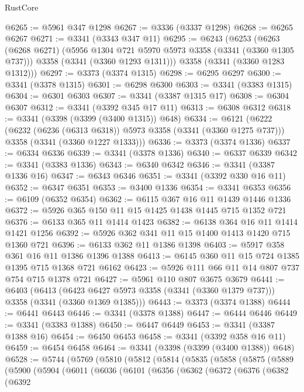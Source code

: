 \begin{lexlean}{RustCore}
\begin{coremodule}
@6265 := @5961 @347 @1298
@6267 := @3336 (@3337 @1298)
@6268 := @6265 @6267
@6271 := @3341 (@3343 @347 @11)
@6295 := @6243
    (@6253
      (@6263
        (@6268 @6271)
        (@5956 @1304 @721 @5970 @5973 @3358 (@3341 (@3360 @1305 @737)))
        @3358
        (@3341 (@3360 @1293 @1311)))
      @3358
      (@3341 (@3360 @1283 @1312)))
@6297 := @3373 (@3374 @1315)
@6298 := @6295 @6297
@6300 := @3341 (@3378 @1315)
@6301 := @6298 @6300
@6303 := @3341 (@3383 @1315)
@6304 := @6301 @6303
@6307 := @3341 (@3387 @1315 @17)
@6308 := @6304 @6307
@6312 := @3341 (@3392 @345 @17 @11)
@6313 := @6308 @6312
@6318 := @3341 (@3398 (@3399 (@3400 @1315)) @648)
@6334 := @6121
    (@6222
      (@6232 (@6236 (@6313 @6318)) @5973 @3358 (@3341 (@3360 @1275 @737)))
      @3358
      (@3341 (@3360 @1227 @1333)))
@6336 := @3373 (@3374 @1336)
@6337 := @6334 @6336
@6339 := @3341 (@3378 @1336)
@6340 := @6337 @6339
@6342 := @3341 (@3383 @1336)
@6343 := @6340 @6342
@6346 := @3341 (@3387 @1336 @16)
@6347 := @6343 @6346
@6351 := @3341 (@3392 @330 @16 @11)
@6352 := @6347 @6351
@6353 := @3400 @1336
@6354 := @3341 @6353
@6356 := @6109 (@6352 @6354)
@6362 := @6115 @367 @16 @11 @1439 @1446 @1336
@6372 := @5926 @365 @150 @11 @15 @1425 @1438 @1445 @715 @1352 @721
@6376 := @6133 @365 @11 @1414 @1423
@6382 := @6138 @364 @16 @11 @1414 @1421 @1256
@6392 := @5926 @362 @341 @11 @15 @1400 @1413 @1420 @715 @1360 @721
@6396 := @6133 @362 @11 @1386 @1398
@6403 := @5917 @358 @361 @16 @11 @1386 @1396 @1388
@6413 := @6145 @360 @11 @15 @724 @1385 @1395 @715 @1368 @721 @6162
@6423 := @5926 @111 @66 @11 @14 @807 @737 @754 @715 @1378 @721
@6427 := @5961 @110 @807 @3675 @3679
@6441 := @6403
    (@6413 (@6423 @6427 @5973 @3358 (@3341 (@3360 @1379 @737))) @3358 (@3341 (@3360 @1369 @1385)))
@6443 := @3373 (@3374 @1388)
@6444 := @6441 @6443
@6446 := @3341 (@3378 @1388)
@6447 := @6444 @6446
@6449 := @3341 (@3383 @1388)
@6450 := @6447 @6449
@6453 := @3341 (@3387 @1388 @16)
@6454 := @6450 @6453
@6458 := @3341 (@3392 @358 @16 @11)
@6459 := @6454 @6458
@6464 := @3341 (@3398 (@3399 (@3400 @1388)) @648)
@6528 := @5744
    (@5769
      (@5810
        (@5812
          (@5814
            (@5835
              (@5858
                (@5875
                  (@5889
                    (@5900
                      (@5904
                        (@6011
                          (@6036
                            (@6101
                              (@6356
                                (@6362
                                  (@6372
                                    (@6376
                                      (@6382
                                        (@6392

\end{coremodule}
\end{lexlean}

